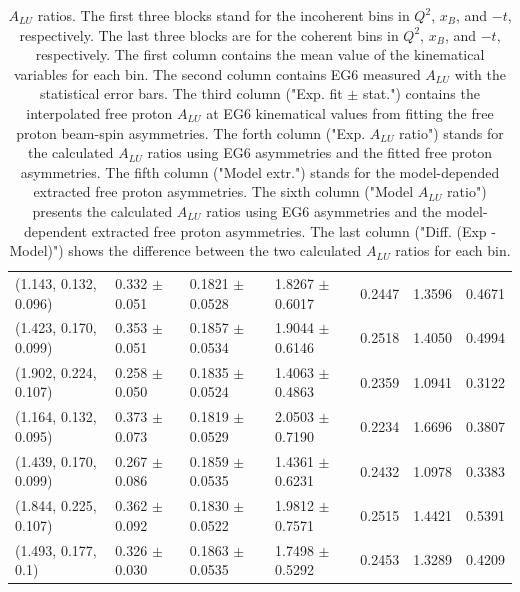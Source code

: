 \begin{landscape}
\begin{table}[!h]
\begin{center}
\begin{tabular}{||l|l|l|l|l|l|l||}
  \hline  \hline  \hline                                                                                               
(1.143, 0.132, 0.096) &  0.332 $\pm$ 0.051   &    0.1821 $\pm$ 0.0528   &  1.8267 $\pm$ 0.6017  &  0.2447 &  1.3596 &  0.4671 \\
(1.423, 0.170, 0.099) &  0.353 $\pm$ 0.051   &    0.1857 $\pm$ 0.0534   &  1.9044 $\pm$ 0.6146  &  0.2518 &  1.4050 &  0.4994 \\
(1.902, 0.224, 0.107) &  0.258 $\pm$ 0.050   &    0.1835 $\pm$ 0.0524   &  1.4063 $\pm$ 0.4863  &  0.2359 &  1.0941 &  0.3122 \\
    \hline \hline  \hline                                                                                              
(1.164, 0.132, 0.095) &  0.373 $\pm$ 0.073   &    0.1819 $\pm$ 0.0529   &  2.0503 $\pm$ 0.7190  &  0.2234 &  1.6696 &  0.3807 \\
(1.439, 0.170, 0.099) &  0.267 $\pm$ 0.086   &    0.1859 $\pm$ 0.0535   &  1.4361 $\pm$ 0.6231  &  0.2432 &  1.0978 &  0.3383 \\
(1.844, 0.225, 0.107) &  0.362 $\pm$ 0.092   &    0.1830 $\pm$ 0.0522   &  1.9812 $\pm$ 0.7571  &  0.2515 &  1.4421 &  0.5391 \\
     \hline  \hline  \hline                                                                                            
(1.493, 0.177, 0.1)   &  0.326 $\pm$ 0.030   &    0.1863 $\pm$ 0.0535   &  1.7498 $\pm$ 0.5292  &  0.2453 &  1.3289 &  0.4209 \\                                                                
 
 \hline
 \end{tabular}
 \caption{$A_{LU}$ ratios. The first three blocks stand for the incoherent bins 
 in $Q^{2}$, $x_{B}$, and $-t$, respectively. The last three blocks are for the 
 coherent bins in $Q^{2}$, $x_{B}$, and $-t$, respectively. The first column 
 contains the mean value of the kinematical variables for each bin. The second 
 column contains EG6 measured $A_{LU}$ with the statistical error bars. The 
 third column ("Exp. fit $\pm$ stat.") contains the interpolated free proton 
 $A_{LU}$ at EG6 kinematical values from fitting the free proton beam-spin 
 asymmetries. The forth column ("Exp. $A_{LU}$ ratio") stands for the 
 calculated $A_{LU}$ ratios using EG6 asymmetries and the fitted free proton 
 asymmetries. The fifth column ("Model extr.") stands for the model-depended 
 extracted free proton asymmetries. The sixth column ("Model $A_{LU}$ ratio") 
 presents the calculated $A_{LU}$ ratios using EG6 asymmetries and the 
 model-dependent extracted free proton asymmetries. The last column ("Diff.  
 (Exp - Model)") shows the difference between the two calculated $A_{LU}$ 
 ratios for each bin.}
 \label{table:ALU_ratios_}
 \end{center}
\end{table}
\end{landscape}





